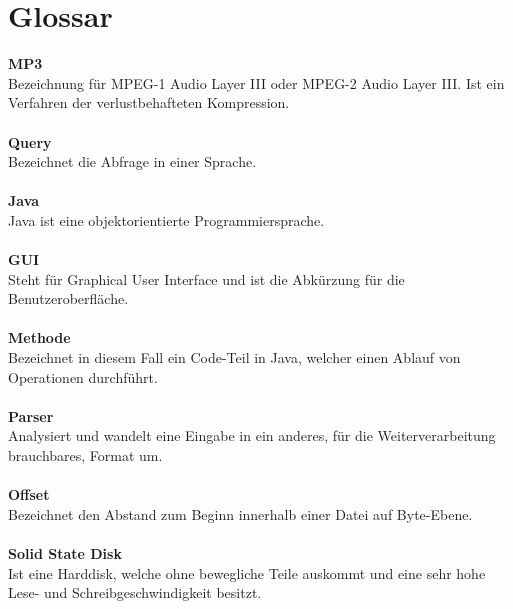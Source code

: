 \documentclass[12pt,a4paper,ngerman]{report}
\begin{document}
\chapter*{Glossar}
\textbf{MP3}\\
Bezeichnung für MPEG-1 Audio Layer III oder MPEG-2 Audio Layer III. Ist ein Verfahren der verlustbehafteten Kompression.\\ \\
\textbf{Query}\\
Bezeichnet die Abfrage in einer Sprache. \\ \\
\textbf{Java}\\
Java ist eine objektorientierte Programmiersprache. \\ \\
\textbf{GUI}\\
Steht für Graphical User Interface und ist die Abkürzung für die Benutzeroberfläche. \\ \\
\textbf{Methode}\\
Bezeichnet in diesem Fall ein Code-Teil in Java, welcher einen Ablauf von Operationen durchführt. \\ \\
\textbf{Parser}\\
Analysiert und wandelt eine Eingabe in ein anderes, für die Weiterverarbeitung brauchbares, Format um. \\ \\
\textbf{Offset}\\
Bezeichnet den Abstand zum Beginn innerhalb einer Datei auf Byte-Ebene. \\ \\ 
\textbf{Solid State Disk} \\
Ist eine Harddisk, welche ohne bewegliche Teile auskommt und eine sehr hohe Lese- und Schreibgeschwindigkeit besitzt.


\nocite{jaudiotagger}
\nocite{lucene1}
\nocite{tika}
\nocite{id31}
\nocite{id32}
\nocite{anut}
\nocite{netzwertig}
\nocite{scinexx1}
\nocite{fingerabdruck}
\nocite{scinexx2}
\nocite{shazam1}
\nocite{mp3}
\nocite{query}
\nocite{modinf}
\nocite{lucene2}
\end{document}
